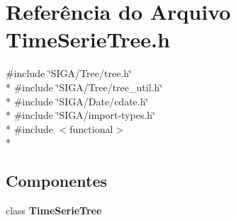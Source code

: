\section{Referência do Arquivo Time\+Serie\+Tree.\+h}
\label{_time_serie_tree_8h}
{\ttfamily \#include \char`\"{}S\+I\+G\+A/\+Tree/tree.\+h\char`\"{}}\\*
{\ttfamily \#include \char`\"{}S\+I\+G\+A/\+Tree/tree\+\_\+util.\+h\char`\"{}}\\*
{\ttfamily \#include \char`\"{}S\+I\+G\+A/\+Date/cdate.\+h\char`\"{}}\\*
{\ttfamily \#include \char`\"{}S\+I\+G\+A/import-\/types.\+h\char`\"{}}\\*
{\ttfamily \#include $<$functional$>$}\\*
\subsection*{Componentes}
\begin{DoxyCompactItemize}
\item 
class {\bf Time\+Serie\+Tree}
\end{DoxyCompactItemize}
